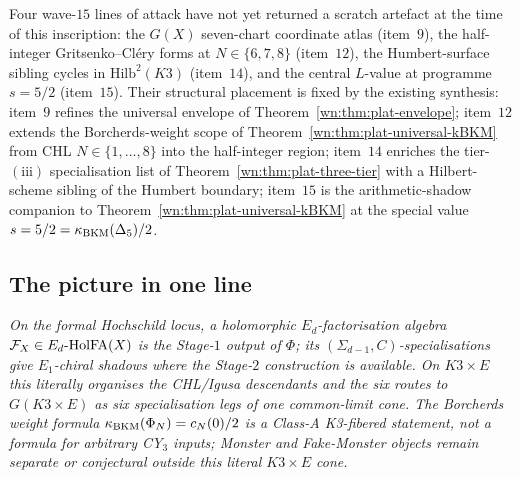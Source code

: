 \begin{remark}
\label{wn:rmk:plat-w15-frontier-in-flight}
Four wave-$15$ lines of attack have not yet returned a scratch
artefact at the time of this inscription: the $G(X)$ seven-chart
coordinate atlas (item~$9$), the half-integer Gritsenko--Cl\'ery
forms at $N \in \{6, 7, 8\}$ (item~$12$), the Humbert-surface
sibling cycles in $\mathrm{Hilb}^2(K3)$ (item~$14$), and the
central $L$-value at programme $s = 5/2$ (item~$15$). Their
structural placement is fixed by the existing synthesis:
item~$9$ refines the universal envelope of
Theorem~\ref{wn:thm:plat-envelope}; item~$12$ extends the
Borcherds-weight scope of Theorem~\ref{wn:thm:plat-universal-kBKM}
from CHL $N \in \{1, \ldots, 8\}$ into the half-integer region;
item~$14$ enriches the tier-$(\mathrm{iii})$ specialisation list
of Theorem~\ref{wn:thm:plat-three-tier} with a Hilbert-scheme
sibling of the Humbert boundary; item~$15$ is the arithmetic-shadow
companion to Theorem~\ref{wn:thm:plat-universal-kBKM} at the
special value $s = 5/2 = \kappa_{\mathrm{BKM}}(\Delta_5)/2$.
\end{remark}

\subsection{The picture in one line}
\label{wn:subsec:plat-one-line}

\emph{On the formal Hochschild locus, a holomorphic
$E_d$-factorisation algebra
$\mathcal{F}_X\in E_d\text{-}\mathrm{HolFA}(X)$ is the Stage-$1$ output of $\Phi$; its
$(\Sigma_{d-1},C)$-specialisations give $E_1$-chiral shadows where the
Stage-$2$ construction is available.  On $K3\times E$ this literally
organises the CHL/Igusa descendants and the six routes to
$G(K3\times E)$ as six specialisation legs of one common-limit cone.  The
Borcherds weight formula $\kappa_{\mathrm{BKM}}(\Phi_N)=c_N(0)/2$ is a Class-A
K3-fibered statement, not a formula for arbitrary CY$_3$ inputs; Monster
and Fake-Monster objects remain separate or conjectural outside this
literal $K3\times E$ cone.}
